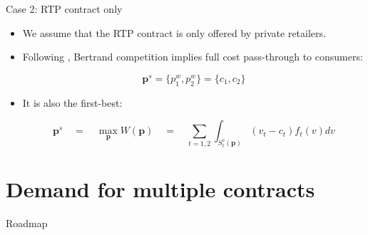 \documentclass{class}
\begin{document}
\begin{frame}{Case 2: RTP contract only}

\begin{itemize}
    \item We assume that the RTP contract is only offered by private retailers.

\vfill

\item  Following \cite{joskow2006retail}, Bertrand competition implies full cost pass-through to consumers: 

\vfill

\begin{equation*}
    \textbf{p}^s = \{p_1^w,p_2^w\}  = \{c_1,c_2\} 
\end{equation*}

\vfill

\item It is also the first-best:

\vfill


\begin{equation*}
 \textbf{p}^s \quad  = \quad  \max_{\textbf{p}}W(\textbf{p}) \quad = \quad  \sum_{t = 1,2} \int_{S^s_t(\textbf{p})} (v_t - c_t) f_t(v) dv 
\end{equation*}


\end{itemize}

\end{frame}


\section{Demand for multiple contracts}


\begin{frame}{Roadmap}
  \tableofcontents [sectionstyle=show/shaded,subsectionstyle=show/shaded]
\end{frame}

\end{document}
